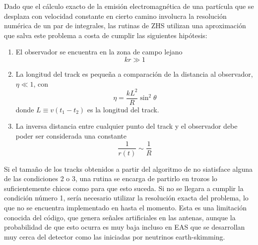 	Dado que el c\'alculo exacto de la emisi\'on electromagn\'etica de una part\'icula que se desplaza con velocidad constante en cierto camino involucra la resoluci\'on num\'erica de un par de integrales, las rutinas de ZHS utilizan una aproximaci\'on que salva este problema a costa de cumplir las siguientes hip\'otesis:
	\begin{enumerate}
	 \item El observador se encuentra en la zona de campo lejano
	 \begin{equation}
	  kr\gg1
	 \end{equation}
	 \item La longitud del track es peque\~na a comparaci\'on de la distancia al observador, $\eta\ll1$, con
	 \begin{equation}
	  \eta = \frac{k L^2}{R}\sin^2\theta
	 \end{equation}
	 donde $L\equiv v(t_1-t_2)$ es la longitud del track.
	 \item La inversa distancia entre cualquier punto del track y el observador debe poder ser considerada una constante
	 \begin{equation}
	  \frac{1}{r(t)}\sim\frac{1}{R}
	 \end{equation}
	\end{enumerate}
	Si el tama\~no de los tracks obtenidos a partir del algoritmo de \aires{} no siatisface alguna de las condiciones 2 o 3, una rutina se encarga de partirlo en trozos lo suficientemente chicos como para que esto suceda.
	Si no se llegara a cumplir la condici\'on n\'umero 1, ser\'ia necesario utilizar la resoluci\'on exacta del problema, lo que no se encuentra implementado en \zhs{} hasta el momento.
	Esta es una limitaci\'on conocida del c\'odigo, que genera se\~nales artificiales en las antenas, aunque la probabilidad de que esto ocurra es muy baja incluso en EAS que se desarrollan muy cerca del detector como las iniciadas por neutrinos earth-skimming.
	
